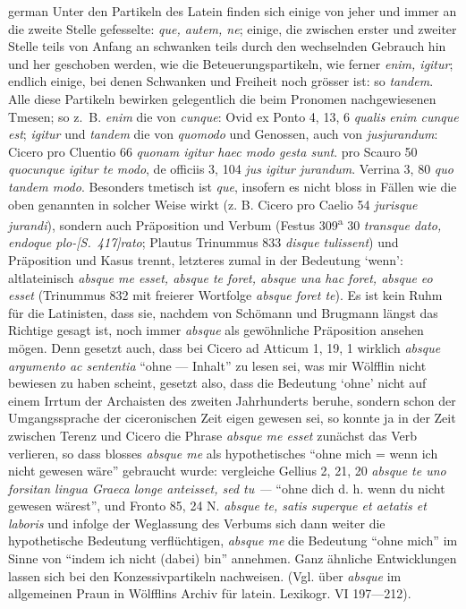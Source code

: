 \begin{otherlanguage*}{german}
Unter den Partikeln des Latein finden sich einige von jeher und immer an die zweite Stelle gefesselte: \emph{que, autem, ne}; einige, die zwischen erster und zweiter Stelle teils von Anfang an schwanken teils durch den wechselnden Gebrauch hin und her geschoben werden, wie die Beteuerungspartikeln, wie ferner \emph{enim, igitur}; endlich einige, bei denen Schwanken und Freiheit noch grösser ist: so \emph{tandem}. Alle diese Partikeln bewirken gelegentlich die beim Pronomen nachgewiesenen Tmesen; so z.~B. \emph{enim} die von \emph{cunque}: Ovid ex Ponto 4, 13, 6 \emph{qualis enim cunque est}; \emph{igitur} und \emph{tandem} die von \emph{quomodo} und Genossen, auch von \emph{jusjurandum}: Cicero pro Cluentio 66 \emph{quonam igitur haec modo gesta sunt}. pro Scauro 50 \emph{quocunque igitur te modo}, de officiis 3, 104 \emph{jus igitur jurandum}. Verrina 3, 80 \emph{quo tandem modo}. Besonders tmetisch ist \emph{que}, insofern es nicht bloss in Fällen wie die oben genannten in solcher Weise wirkt (z. B. Cicero pro Caelio 54 \emph{jurisque jurandi}), sondern auch Präposition und Verbum (Festus 309\textsuperscript{a} 30 \emph{transque dato, endoque plo-}\hypertarget{p417}{\emph{[S.~417]}}\label{p417}\emph{rato}; Plautus Trinummus 833 \emph{disque tulissent}) und Präposition und Kasus trennt, letzteres zumal in der Bedeutung ‘wenn’: altlateinisch \emph{absque me esset, absque te foret, absque una hac foret, absque eo esset} (Trinummus 832 mit freierer Wortfolge \emph{absque foret te}). Es ist kein Ruhm für die Latinisten, dass sie, nachdem von Schömann und Brugmann längst das Richtige gesagt ist, noch immer \emph{absque} als gewöhnliche Präposition ansehen mögen. Denn gesetzt auch, dass bei Cicero ad Atticum 1, 19, 1 wirklich \emph{absque argumento ac sententia} “ohne — Inhalt” zu lesen sei, was mir Wölfflin nicht bewiesen zu haben scheint, gesetzt also, dass die Bedeutung ‘ohne’ nicht auf einem Irrtum der Archaisten des zweiten Jahrhunderts beruhe, sondern schon der Umgangssprache der ciceronischen Zeit eigen gewesen sei, so konnte ja in der Zeit zwischen Terenz und Cicero die Phrase \emph{absque me esset} zunächst das Verb verlieren, so dass blosses \emph{absque me} als hypothetisches “ohne mich = wenn ich nicht gewesen wäre” gebraucht wurde: vergleiche Gellius 2, 21, 20 \emph{absque te uno forsitan lingua Graeca longe anteisset, sed tu —} “ohne dich d. h. wenn du nicht gewesen wärest”, und Fronto 85, 24 N. \emph{absque te, satis superque et aetatis et laboris} und infolge der Weglassung des Verbums sich dann weiter die hypothetische Bedeutung verflüchtigen, \emph{absque me} die Bedeutung “ohne mich” im Sinne von “indem ich nicht (dabei) bin” annehmen. Ganz ähnliche Entwicklungen lassen sich bei den Konzessivpartikeln nachweisen. (Vgl. über \emph{absque} im allgemeinen Praun in Wölfflins Archiv für latein. Lexikogr. VI 197—212).


\end{otherlanguage*}
